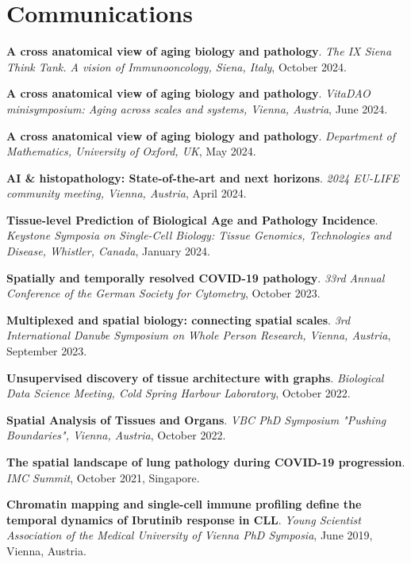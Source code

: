 \documentclass[11pt,a4paper,roman]{moderncv} %
\begin{document}
\section{Communications}
        \begin{etaremune}[leftmargin=1.0cm,itemindent=0pt,topsep=10pt,itemsep=2pt,partopsep=0pt,parsep=0pt]
        \item
        \textbf{A cross anatomical view of aging biology and pathology}. \textit{The IX Siena Think Tank. A vision of Immunooncology, Siena, Italy}, October 2024.
        \item
        \textbf{A cross anatomical view of aging biology and pathology}. \textit{VitaDAO minisymposium: Aging across scales and systems, Vienna, Austria}, June 2024.
        \item
        \textbf{A cross anatomical view of aging biology and pathology}. \textit{Department of Mathematics, University of Oxford, UK}, May 2024.
        \item
        \textbf{AI \& histopathology: State-of-the-art and next horizons}. \textit{2024 EU-LIFE community meeting, Vienna, Austria}, April 2024.
        \item
        \textbf{Tissue-level Prediction of Biological Age and Pathology Incidence}. \textit{Keystone Symposia on Single-Cell Biology: Tissue Genomics, Technologies and Disease, Whistler, Canada}, January 2024.
        \item
        \textbf{Spatially and temporally resolved COVID-19 pathology}. \textit{33rd Annual Conference of the German Society for Cytometry}, October 2023.
        \item
        \textbf{Multiplexed and spatial biology: connecting spatial scales}. \textit{3rd International Danube Symposium on Whole Person Research, Vienna, Austria}, September 2023.
        \item
        \textbf{Unsupervised discovery of tissue architecture with graphs}. \textit{Biological Data Science Meeting, Cold Spring Harbour Laboratory}, October 2022.
        \item
        \textbf{Spatial Analysis of Tissues and Organs}. \textit{VBC PhD Symposium "Pushing Boundaries", Vienna, Austria}, October 2022.
        \item
        \textbf{The spatial landscape of lung pathology during COVID-19 progression}. \textit{IMC Summit}, October 2021, Singapore.
        \item
        \textbf{Chromatin mapping and single-cell immune profiling define the temporal dynamics of Ibrutinib response in CLL}. \textit{Young Scientist Association of the Medical University of Vienna PhD Symposia}, June 2019, Vienna, Austria.

\end{etaremune}
\end{document}
